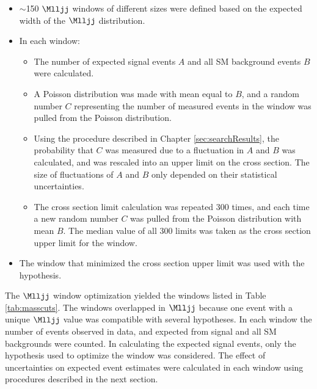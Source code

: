 \begin{itemize}
	\item $\sim$150 $\Mlljj$ windows of different sizes were defined based on the expected width of the \WR $\Mlljj$ distribution.
	\item In each window:
	\begin{itemize}
		\item The number of expected signal events $A$ and all SM background events $B$ were calculated.
		\item A Poisson distribution was made with mean equal to $B$, and a random number $C$ representing 
			the number of measured events in the window was pulled from the Poisson distribution.
		\item Using the procedure described in Chapter \ref{sec:searchResults}, the probability that $C$ 
			was measured due to a fluctuation in $A$ and $B$ was calculated, and was rescaled into an 
			upper limit on the \WR cross section.  The size of fluctuations of $A$ and $B$ only depended 
			on their statistical uncertainties.
		\item The cross section limit calculation was repeated 300 times, and each time a new random 
			number $C$ was pulled from the Poisson distribution with mean $B$.  The median value of 
			all 300 limits was taken as the cross section upper limit for the window.
	\end{itemize}
	\item The window that minimized the \WR cross section upper limit was used with the \mWR hypothesis.
\end{itemize}

The $\Mlljj$ window optimization yielded the windows listed in Table \ref{tab:masscuts}.  The windows 
overlapped in $\Mlljj$ because one event with a unique $\Mlljj$ value was compatible with several 
\mWR hypotheses.  In each window the number of events observed in data, and expected from \WR 
signal and all SM backgrounds were counted.  In calculating the expected \WR signal events, only 
the \mWR hypothesis used to optimize the window was considered.  The effect of uncertainties on 
expected event estimates were calculated in each window using procedures described in the next 
section.

